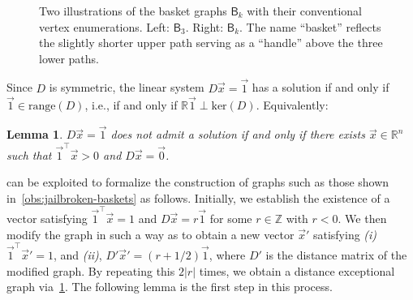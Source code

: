 \documentclass[11pt,a4paper]{article}
\newcommand{\distmatrix}{D}
\newcommand{\x}{\vec{x}}
\newcommand{\one}{\vec{1}}
\newcommand{\zero}{\vec{0}}
\newcommand{\Basket}{\mathsf{B}}
\newtheorem{lemma}[theorem]{Lemma}
\begin{document}
\begin{figure}[t!]

        \caption{Two illustrations of the basket graphs $\Basket_k$ with their conventional vertex enumerations. Left: $\Basket_3$. Right: $\Basket_k$. The name ``basket'' reflects the slightly shorter upper path serving as a ``handle'' above the three lower paths.}\label{fig:basket}
    \end{figure}

    Since $\distmatrix$ is symmetric, the linear system $\distmatrix\x=\one$ has a solution if and only if $\one\in\mathrm{range}(\distmatrix)$, i.e., if and only if $\mathbb{R}\one\perp \mathrm{ker}(\distmatrix)$. Equivalently:

    \begin{lemma}\label{lem:dne-positive-sum-kernel}
        $\distmatrix\x  = \one $ does not admit a solution if and only if there exists $\x \in\mathbb{R}^{n}$ such that $\one^\top\x  > 0$ and $\distmatrix\x  = \zero$. 
    \end{lemma}

     can be exploited to formalize the construction of graphs such as those shown in~\cref{obs:jailbroken-baskets} as follows. Initially, we establish the existence of a vector satisfying $\one^\top\x  = 1$ and $\distmatrix\x  = r \one $ for some $r\in\mathbb{Z}$ with $r < 0$. We then modify the graph in such a way as to obtain a new vector $\x'$ satisfying \emph{(i)} $\one^\top\x' = 1$, and \emph{(ii)}, $\distmatrix'\x' = (r+1/2) \one $, where $\distmatrix'$ is the distance matrix of the modified graph. By repeating this $2|r|$ times, we obtain a distance exceptional graph via~\cref{lem:dne-positive-sum-kernel}. The following lemma is the first step in this process.
\end{document}
